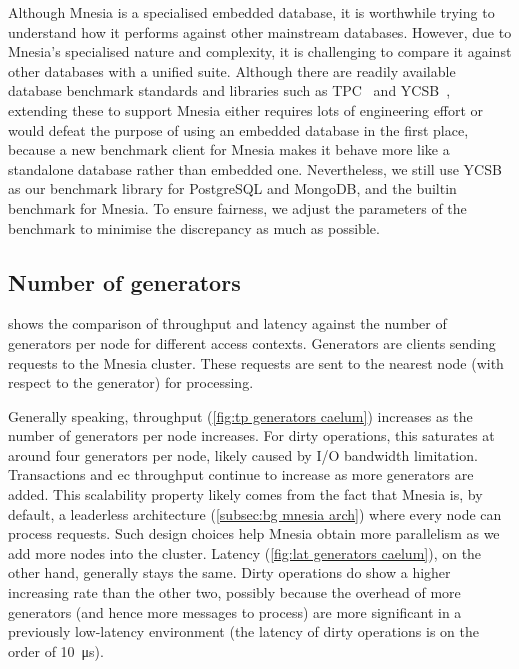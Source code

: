 Although Mnesia is a specialised embedded database, it is worthwhile trying to understand
how it performs against other mainstream databases. However, due to Mnesia's specialised nature
and complexity, it is challenging to compare it against other databases with a unified 
suite. Although there are readily available database benchmark standards and libraries such
as TPC~\cite{} and YCSB~\cite{}, extending these to support Mnesia either requires lots of
engineering effort or would defeat the purpose of using an embedded database in the first place,
because a new benchmark client for Mnesia makes it behave more like a standalone database rather
than embedded one. Nevertheless, we still use YCSB as our benchmark library for PostgreSQL and
MongoDB, and the builtin benchmark for Mnesia. To ensure fairness, we adjust the parameters 
of the benchmark to minimise the discrepancy as much as possible.


\subsection{Number of generators} \label{subsec:eval generator number}

 shows the comparison of throughput and latency against
the number of generators per node for different access contexts. Generators are clients 
sending requests to the Mnesia cluster. 
These requests are sent to the nearest node (with respect to the generator) for processing. 

Generally speaking, throughput (\cref{fig:tp generators caelum}) increases as 
the number of generators per node increases. For dirty operations, this saturates 
at around four generators per node, likely caused by I/O bandwidth limitation. 
Transactions and \acrshort{ec} throughput continue to increase as more generators are added. 
This scalability property likely comes from the fact that
Mnesia is, by default, a leaderless architecture (\cref{subsec:bg mnesia arch}) 
where every node can process requests. Such design choices help Mnesia obtain 
more parallelism as we add
more nodes into the cluster. Latency (\cref{fig:lat generators caelum}), on the
other hand, generally stays the same. Dirty operations do show a higher increasing
rate than the other two, possibly because the overhead of more generators (and hence
more messages to process) are more significant in a previously low-latency
environment (the latency of dirty operations is on the order of \qty{10}{\micro\second}).

